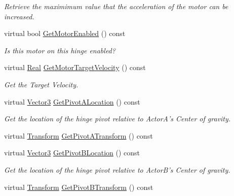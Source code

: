 \begin{DoxyCompactItemize}
\begin{DoxyCompactList}\small\item\em Retrieve the maximimum value that the acceleration of the motor can be increased. \item\end{DoxyCompactList}\item 
virtual bool \hyperlink{classphys_1_1HingeConstraint_abc2a2e5046276f3cdab285d87f969c8a}{GetMotorEnabled} () const 
\begin{DoxyCompactList}\small\item\em Is this motor on this hinge enabled? \item\end{DoxyCompactList}\item 
virtual \hyperlink{namespacephys_af7eb897198d265b8e868f45240230d5f}{Real} \hyperlink{classphys_1_1HingeConstraint_aeb1844f6bffeb72995e95b9ea25be3b7}{GetMotorTargetVelocity} () const 
\begin{DoxyCompactList}\small\item\em Get the Target Velocity. \item\end{DoxyCompactList}\item 
virtual \hyperlink{classphys_1_1Vector3}{Vector3} \hyperlink{classphys_1_1HingeConstraint_a099fec821a9194cd3c8268d764ec8ea8}{GetPivotALocation} () const 
\begin{DoxyCompactList}\small\item\em Get the location of the hinge pivot relative to ActorA's Center of gravity. \item\end{DoxyCompactList}\item 
virtual \hyperlink{classphys_1_1Transform}{Transform} \hyperlink{classphys_1_1HingeConstraint_ac210cfa2fe2d4d6b2bf9e626441546b7}{GetPivotATransform} () const 
\item 
virtual \hyperlink{classphys_1_1Vector3}{Vector3} \hyperlink{classphys_1_1HingeConstraint_a7b0ed683e55a1500e4c8cc6c04e8e140}{GetPivotBLocation} () const 
\begin{DoxyCompactList}\small\item\em Get the location of the hinge pivot relative to ActorB's Center of gravity. \item\end{DoxyCompactList}\item 
virtual \hyperlink{classphys_1_1Transform}{Transform} \hyperlink{classphys_1_1HingeConstraint_ac328b988f24c490084fdb4567cd5df06}{GetPivotBTransform} () const 

\end{DoxyCompactItemize}
